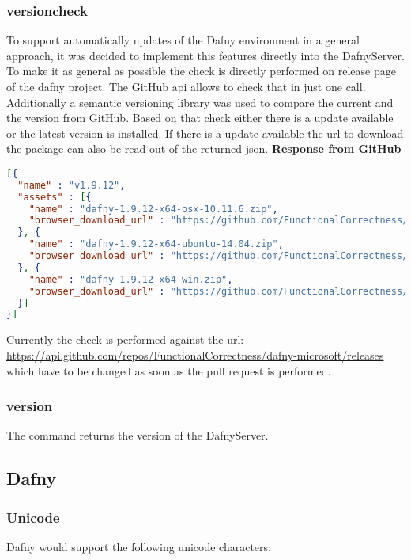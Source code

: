 \subsubsection{versioncheck}
To support automatically updates of the Dafny environment in a general approach, it was decided to implement this features directly into the DafnyServer. To make it as general as possible the check is directly performed on release page of the dafny project. The GitHub api allows to check that in just one call. Additionally a semantic versioning library\cite{semver} was used to compare the current and the version from GitHub. Based on that check either there is a update available or the latest version is installed. If there is a update available the url to download the package can also be read out of the returned json. 
\newline
\textbf{Response from GitHub}
\begin{lstlisting}[language=json,firstnumber=1]
[{
  "name" : "v1.9.12",
  "assets" : [{
    "name" : "dafny-1.9.12-x64-osx-10.11.6.zip",
    "browser_download_url" : "https://github.com/FunctionalCorrectness/dafny-microsoft/releases/download/v1.9.12/dafny-1.9.12-x64-osx-10.11.6.zip"
  }, {
    "name" : "dafny-1.9.12-x64-ubuntu-14.04.zip",
    "browser_download_url" : "https://github.com/FunctionalCorrectness/dafny-microsoft/releases/download/v1.9.12/dafny-1.9.12-x64-ubuntu-14.04.zip"
  }, {
    "name" : "dafny-1.9.12-x64-win.zip",
    "browser_download_url" : "https://github.com/FunctionalCorrectness/dafny-microsoft/releases/download/v1.9.12/dafny-1.9.12-x64-win.zip"
  }]
}]
\end{lstlisting}

Currently the check is performed against the url:  \href{https://api.github.com/repos/FunctionalCorrectness/dafny-microsoft/releases}{https://api.github.com/repos/FunctionalCorrectness/dafny-microsoft/releases} which have to be changed as soon as the pull request is performed. 


\subsubsection{version}
The command returns the version of the DafnyServer.  


\subsection{Dafny}

\subsubsection{Unicode}
Dafny would support the following unicode characters: 

